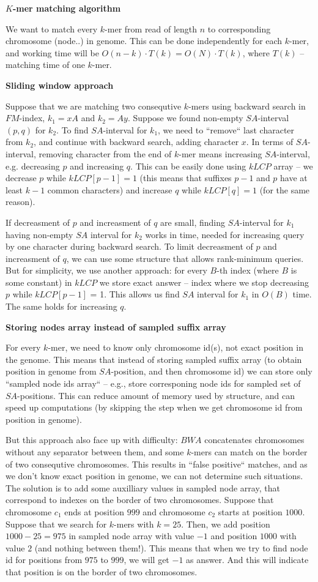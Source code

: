 \documentclass[12pt]{article}
\begin{document}
{\bf $K$-mer matching algorithm}

We want to match every $k$-mer from read of length $n$ to corresponding chromosome (node..) in genome. This can be done independently for each $k$-mer, and working time will be $O(n-k) \cdot T(k) = O(N) \cdot T(k)$, where $T(k)$ -- matching time of one $k$-mer. 

{\bf Sliding window approach}

Suppose that we are matching two consequtive $k$-mers using backward search in $FM$-index, $k_1 = xA$ and $k_2 = Ay$. Suppose we found non-empty $SA$-interval $(p, q)$ for $k_2$. To find $SA$-interval for $k_1$, we need to ``remove`` last character from $k_2$, and continue with backward search, adding character $x$. In terms of $SA$-interval, removing character from the end of $k$-mer means increasing $SA$-interval, e.g. decreasing $p$ and increasing $q$. This can be easily done using $kLCP$ array -- we decrease $p$ while $kLCP[p-1] = 1$ (this means that suffixes $p-1$ and $p$ have at least $k-1$ common characters) and increase $q$ while $kLCP[q] = 1$ (for the same reason).

If decreasment of $p$ and increasment of $q$ are small, finding $SA$-interval for $k_1$ having non-empty $SA$ interval for $k_2$ works in time, needed for increasing query by one character during backward search. To limit decreasment of $p$ and increasment of $q$, we can use some structure that allows rank-minimum queries. But for simplicity, we use another approach: for every $B$-th index (where $B$ is some constant) in $kLCP$ we store exact answer -- index where we stop decreasing $p$ while $kLCP[p-1]$ = 1. This allows us find $SA$ interval for $k_1$ in $O(B)$ time. The same holds for increasing $q$.

{\bf Storing nodes array instead of sampled suffix array}

For every $k$-mer, we need to know only chromosome id(s), not exact position in the genome. This means that instead of storing sampled suffix array (to obtain position in genome from $SA$-position, and then chromosome id) we can store only ``sampled node ids array`` -- e.g., store corresponing node ids for sampled set of $SA$-positions. This can reduce amount of memory used by structure, and can speed up computations (by skipping the step when we get chromosome id from position in genome).

But this approach also face up with difficulty: $BWA$ concatenates chromosomes without any separator between them, and some $k$-mers can match on the border of two consequtive chromosomes. This results in ``false positive`` matches, and as we don't know exact position in genome, we can not determine such situations. The solution is to add some auxilliary values in sampled node array, that correspond to indexes on the border of two chromosomes. Suppose that chromosome $c_1$ ends at position $999$ and chromosome $c_2$ starts at position $1000$. Suppose that we search for $k$-mers with $k=25$. Then, we add position $1000-25 = 975$ in sampled node array with value $-1$ and position $1000$ with value $2$ (and nothing between them!). This means that when we try to find node id for positions from $975$ to $999$, we will get $-1$ as answer. And this will indicate that position is on the border of two chromosomes.
\end{document}
